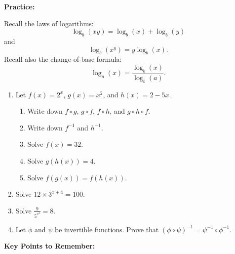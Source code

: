 \documentclass{article}
\begin{document}
\textbf{Practice:}

\vspace{5mm}

Recall the laws of logarithms:
\[\log_b(xy)=\log_b(x)+\log_b(y)\]
and
\[\log_b(x^y)=y\log_b(x).\]
Recall also the change-of-base formula:
\[\log_a(x)=\frac{\log_b(x)}{\log_b(a)}.\]



\begin{enumerate}
	\item Let $f(x)=2^x$, $g(x)=x^2$, and $h(x)=2-5x$.
		\begin{enumerate}
			\item Write down $f\circ g$, $g\circ f$, $f\circ h$, and $g\circ h\circ f$.
			\item Write down $f^{-1}$ and $h^{-1}$.
			\item Solve $f(x)=32$.
			\item Solve $g(h(x))=4$.
			\item Solve $f(g(x))=f(h(x))$.
		\end{enumerate}
	\item Solve $12\times3^{x+4}=100$.
	\item Solve $\frac{9}{5^{x^2}}=8$.
	\item Let $\phi$ and $\psi$ be invertible functions. Prove that $(\phi\circ \psi)^{-1}=\psi^{-1}\circ\phi^{-1}$.
\end{enumerate}


\clearpage








{\bf Key Points to Remember:}

\vspace{5mm}
\end{document}
